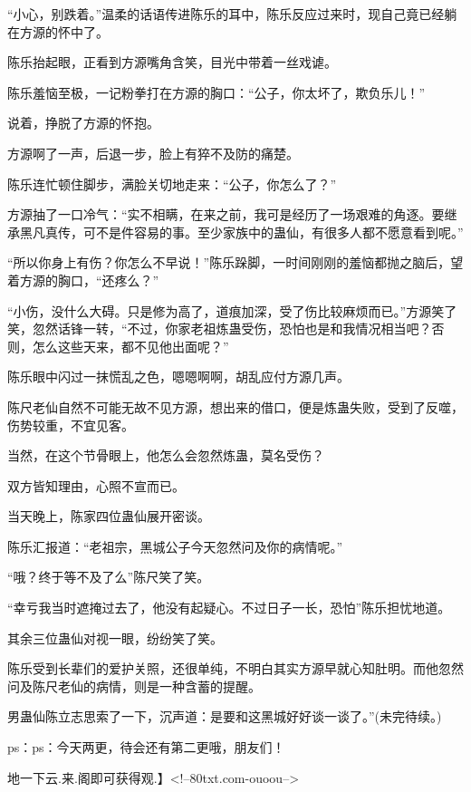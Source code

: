 \begin{this_body}
“小心，别跌着。”温柔的话语传进陈乐的耳中，陈乐反应过来时，现自己竟已经躺在方源的怀中了。

陈乐抬起眼，正看到方源嘴角含笑，目光中带着一丝戏谑。

陈乐羞恼至极，一记粉拳打在方源的胸口：“公子，你太坏了，欺负乐儿！”

说着，挣脱了方源的怀抱。

方源啊了一声，后退一步，脸上有猝不及防的痛楚。

陈乐连忙顿住脚步，满脸关切地走来：“公子，你怎么了？”

方源抽了一口冷气：“实不相瞒，在来之前，我可是经历了一场艰难的角逐。要继承黑凡真传，可不是件容易的事。至少家族中的蛊仙，有很多人都不愿意看到呢。”

“所以你身上有伤？你怎么不早说！”陈乐跺脚，一时间刚刚的羞恼都抛之脑后，望着方源的胸口，“还疼么？”

“小伤，没什么大碍。只是修为高了，道痕加深，受了伤比较麻烦而已。”方源笑了笑，忽然话锋一转，“不过，你家老祖炼蛊受伤，恐怕也是和我情况相当吧？否则，怎么这些天来，都不见他出面呢？”

陈乐眼中闪过一抹慌乱之色，嗯嗯啊啊，胡乱应付方源几声。

陈尺老仙自然不可能无故不见方源，想出来的借口，便是炼蛊失败，受到了反噬，伤势较重，不宜见客。

当然，在这个节骨眼上，他怎么会忽然炼蛊，莫名受伤？

双方皆知理由，心照不宣而已。

当天晚上，陈家四位蛊仙展开密谈。

陈乐汇报道：“老祖宗，黑城公子今天忽然问及你的病情呢。”

“哦？终于等不及了么”陈尺笑了笑。

“幸亏我当时遮掩过去了，他没有起疑心。不过日子一长，恐怕”陈乐担忧地道。

其余三位蛊仙对视一眼，纷纷笑了笑。

陈乐受到长辈们的爱护关照，还很单纯，不明白其实方源早就心知肚明。而他忽然问及陈尺老仙的病情，则是一种含蓄的提醒。

男蛊仙陈立志思索了一下，沉声道：是要和这黑城好好谈一谈了。”(未完待续。)

ps：ps：今天两更，待会还有第二更哦，朋友们！

地一下云.来.阁即可获得观.】<!--80txt.com-ouoou-->

\end{this_body}

